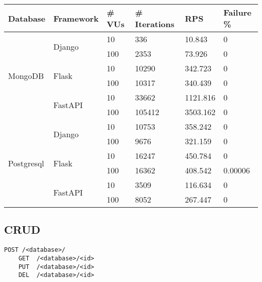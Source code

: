 \documentclass[12pt,onecolumn,a4paper,titlepage]{article}
\begin{document}
{\renewcommand{\arraystretch}{1.5}
\begin{tabular}{| p{1.8cm} | p{2cm} | p{1.3cm} | p{2cm} | p{1.9cm} | p{2cm} |} 
    \hline
    Database & Framework & \# VUs & \# \footnotesize{Iterations} & RPS & \footnotesize{Failure \%} \\
    \hline
    \multirow{6}{*}{MongoDB} & \multirow{2}{*}{Django} & 10 & 336 & 10.843 & 0\\
    & & 100 & 2353 & 73.926 & 0\\
    & \multirow{2}{*}{Flask} & 10 & 10290 & 342.723 & 0\\
    & & 100 & 10317 & 340.439 & 0\\
    & \multirow{2}{*}{FastAPI} & 10 & 33662 & 1121.816 & 0\\
    & & 100 & 105412 & 3503.162 & 0\\
    \hline
    \multirow{6}{*}{Postgresql} & \multirow{2}{*}{Django} & 10 & 10753 & 358.242 & 0\\
    & & 100 & 9676 & 321.159 & 0\\
    & \multirow{2}{*}{Flask} & 10 & 16247 & 450.784 & 0\\
    & & 100 & 16362 & 408.542 & 0.00006\\
    & \multirow{2}{*}{FastAPI} & 10 & 3509 & 116.634 & 0\\
    & & 100 & 8052 & 267.447 & 0\\
    \hline
\end{tabular}
}

\pagebreak
\subsection{CRUD}

\begin{lstlisting}[style=mystyle]
    POST /<database>/
    GET  /<database>/<id>
    PUT  /<database>/<id>
    DEL  /<database>/<id>
\end{lstlisting}
\end{document}
